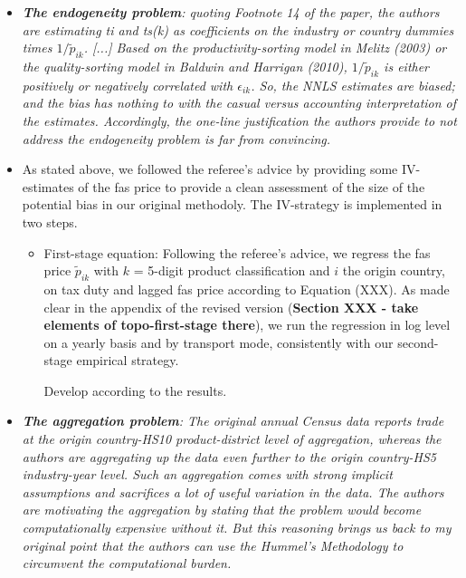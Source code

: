 \documentclass[a4paper,12pt]{article}
\begin{document}
\begin{itemize}
\item \textit{\textbf{The endogeneity problem}: quoting Footnote 14 of the paper, the authors
are estimating ti and ts(k) as coefficients on the industry or country
dummies times $1/\widetilde{p}_{ik}$. [...] Based on the productivity-sorting model in Melitz (2003) or the quality-sorting
model in Baldwin and Harrigan (2010),  $1/\widetilde{p}_{ik}$ is either positively
or negatively correlated with $\epsilon_{ik}$. So, the NNLS estimates are biased; and
the bias has nothing to with the casual versus accounting interpretation of
the estimates. Accordingly, the one-line justification the authors provide
to not address the endogeneity problem is far from convincing.}


\item[\text{Answer}] As stated above, we followed the referee's advice by providing some IV-estimates of the fas price to provide a clean assessment of the size of the potential bias in our original methodoly. The IV-strategy is implemented in two steps.
    \begin{itemize}
    \item First-stage equation: Following the referee's advice, we regress the fas price $\widetilde{p}_{ik}$ with $k$ = 5-digit product classification and $i$ the origin country, on tax duty and lagged fas price according to Equation (XXX). As made clear in the appendix of the revised version (\textbf{Section XXX - take elements of topo-first-stage there}), we run the regression in log level on a yearly basis and by transport mode, consistently with our second-stage empirical strategy.


        Develop according to the results.


    \end{itemize}
    \item \textit{\textbf{The aggregation problem}: The original annual Census data reports
trade at the origin country-HS10 product-district level of aggregation,
whereas the authors are aggregating up the data even further to the origin
country-HS5 industry-year level. Such an aggregation comes with strong implicit assumptions and sacrifices a lot of useful variation in the data.
The authors are motivating the aggregation by stating that the problem
would become computationally expensive without it. But this reasoning
brings us back to my original point that the authors can use the Hummel's
Methodology to circumvent the computational burden.}


\end{itemize}
\end{document}
